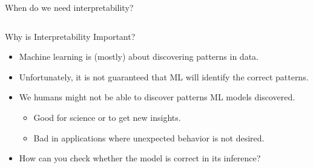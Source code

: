 \documentclass[11pt,compress,t,notes=noshow, aspectratio=169, xcolor=table]{beamer}
\begin{document}
\begin{frame}{When do we need interpretability?}
\begin{columns}[T]
\begin{column}{0.4\textwidth}
   \centering {}
\end{column}
\end{columns}
\end{frame}



\begin{frame}{Why is Interpretability Important?}

	\begin{itemize}
	    \item Machine learning is (mostly) about discovering patterns in data.
	    \medskip
	    \item Unfortunately, it is not guaranteed that ML will identify the correct patterns.

	    \medskip
	    \item We humans might not be able to discover patterns ML models discovered.
	    \begin{itemize}
	        \item Good for science or to get new insights.
	        \item Bad in applications where unexpected behavior is not desired.
	    \end{itemize}
	    \medskip

	    \item \alert{How can you check whether the model is correct in its inference?}
	\end{itemize}

\end{frame}
\end{document}
